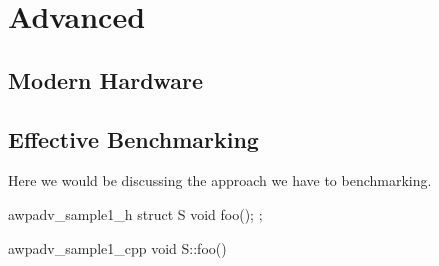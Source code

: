 \chapter{Advanced}
\section{Modern Hardware}
\section{Effective Benchmarking}

Here we would be discussing the approach we have to benchmarking.  

\begin{cppcodeblock}{awpadv_sample1_h}
  struct S {
    void foo();
  };
\end{cppcodeblock}

\begin{cppcodeblock}{awpadv_sample1_cpp}
  void S::foo()
  {
  }
\end{cppcodeblock}
